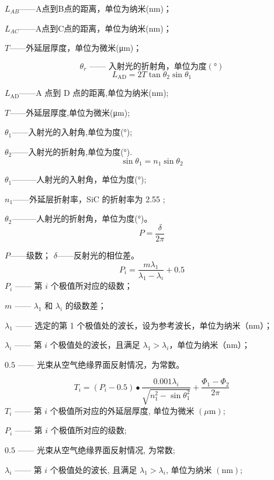 \documentclass[withoutpreface,bwprint]{cumcmthesis}
\begin{document}
$L_{AB}$——A点到B点的距离，单位为纳米(nm)；

$L_{AC}$——A点到C点的距离，单位为纳米(nm)；

$T$——外延层厚度，单位为微米(μm)；

\begin{equation}
\theta_r \text{ —— 入射光的折射角，单位为度} (°)
\end{equation}
$$L_{\mathrm{AD}}=2T\tan\theta_{2}\sin\theta_{1}$$

$L_{\mathrm{AD}}$——A 点到 D 点的距离,单位为纳米(nm);

$T$——外延层厚度,单位为微米(μm);

$\theta_{1}$——入射光的入射角,单位为度(°);

$\theta_{2}$——入射光的折射角,单位为度(°).
\begin{equation}\sin\theta_1=n_1\sin\theta_2\end{equation}

$\theta_1$———人射光的入射角，单位为度(°);

$n_1$——外延层折射率，SiC 的折射率为 2.55 ;

$\theta_2$———人射光的折射角，单位为度(°)。
\begin{equation}P=\frac{\delta}{2\pi}\end{equation}

$P$——级数；
$\delta$——反射光的相位差。
\begin{equation}P_i=\frac{m\lambda_1}{\lambda_1-\lambda_i}+0.5\end{equation}
$P_{i}$ —— 第 $i$ 个极值所对应的级数；

$m$ —— $\lambda_{1}$ 和 $\lambda_{i}$ 的级数差；

$\lambda_{1}$ —— 选定的第 1 个极值处的波长，设为参考波长，单位为纳米（nm）；

$\lambda_{i}$ —— 第 $i$ 个极值处的波长，且满足 $\lambda_{1} > \lambda_{i}$，单位为纳米（nm）；

$0.5$ —— 光束从空气绝缘界面反射情况，为常数。


\begin{equation}T_i=(P_i-0.5)\bullet\frac{0.001\lambda_i}{\sqrt{n_1^2-\sin\theta_1^2}}+\frac{\Phi_1-\Phi_2}{2\pi}\end{equation}
$T_{i}$ —— 第 $i$ 个极值所对应的外延层厚度, 单位为微米 $(\mu\mathrm{m})$;

$P_{i}$ —— 第 $i$ 个极值所对应的级数;

$0.5$ —— 光束从空气绝缘界面反射情况, 为常数;

$\lambda_{i}$ —— 第 $i$ 个极值处的波长, 且满足 $\lambda_{1}>\lambda_{i}$, 单位为纳米 $(\mathrm{nm})$;
\end{document}
